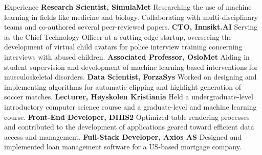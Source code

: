\begin{rubric}{Experience}
%
\entry*[2021 -- present]%
\textbf{Research Scientist, SimulaMet} Researching the use of machine learning in fields like medicine and biology. Collaborating with multi-disciplinary teams and co-authored several peer-reviewed papers.
%
\entry*[2023 -- present]%
\textbf{CTO, Innsikt.AI} Serving as the Chief Technology Officer at a cutting-edge startup, overseeing the development of virtual child avatars for police interview training concerning interviews with abused children.
%
\entry*[2023 -- present]%
\textbf{Associated Professor, OsloMet} Aiding in student supervision and development of machine learning-based interventions for musculoskeletal disorders.
%
\entry*[2022 -- 2023]%
\textbf{Data Scientist, ForzaSys} Worked on designing and implementing algorithms for automatic clipping and highlight generation of soccer matches.
%
%
\entry*[2019 -- 2020]%
\textbf{Lecturer, Høyskolen Kristiania} Held a undergraduate-level introductory computer science course and a graduate-level and machine learning course.
%
\entry*[2016 -- 2018]%
\textbf{Front-End Developer, DHIS2} Optimized table rendering processes and contributed to the development of applications geared toward efficient data access and management.
%
\entry*[2014 -- 2016]%
\textbf{Full-Stack Developer, Axios AS} Designed and implemented loan management software for a US-based mortgage company.
%
\end{rubric}